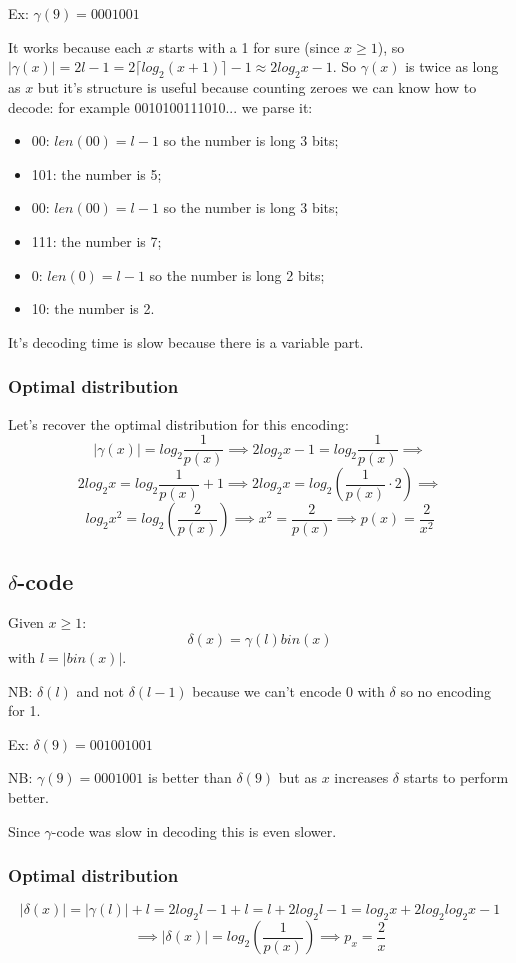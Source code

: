 Ex: $\gamma(9) = 000 1001$

It works because each $x$ starts with a 1 for sure (since $x \geq 1$), so $|\gamma(x)| = 2l-1 = 2 \lceil log_2 (x+1) \rceil - 1 \approx 2log_2 x -1$.
So $\gamma(x)$ is twice as long as $x$ but it's structure is useful because counting zeroes we can know how to decode: for example 0010100111010... we parse it:
\begin{itemize}
    \item 00: $len(00) = l-1$ so the number is long 3 bits;
    \item 101: the number is 5;
    \item 00: $len(00) = l-1$ so the number is long 3 bits;
    \item 111: the number is 7;
    \item 0: $len(0) = l-1$ so the number is long 2 bits;
    \item 10: the number is 2.
\end{itemize}

It's decoding time is slow because there is a variable part.

\subsubsection{Optimal distribution}
Let's recover the optimal distribution for this encoding:
$$
    |\gamma(x)| = log_2 \frac{1}{p(x)} \implies 2log_2 x - 1 = log_2 \frac{1}{p(x)} \implies
$$
$$
    2log_2 x = log_2 \frac{1}{p(x)} + 1 \implies 2log_2 x = log_2 \left( \frac{1}{p(x)} \cdot 2 \right) \implies
$$
$$
    log_2 x^2 = log_2 \left( \frac{2}{p(x)} \right) \implies x^2 = \frac{2}{p(x)} \implies p(x) = \frac{2}{x^2}
$$

\subsection{$\delta$-code}
Given $x \geq 1$:
$$
    \delta(x) = \gamma(l) bin(x)
$$
with $l = |bin(x)|$.

NB: $\delta(l)$ and not $\delta(l-1)$ because we can't encode 0 with $\delta$ so no encoding for 1.

Ex: $\delta(9) = 00100 1001$

NB: $\gamma(9) = 0001001$ is better than $\delta(9)$ but as $x$ increases $\delta$ starts to perform better.

Since $\gamma$-code was slow in decoding this is even slower. 

\subsubsection{Optimal distribution}
$$
    |\delta(x)| = |\gamma(l)| + l = 2log_2 l - 1 + l = l + 2log_2 l -1 = log_2 x + 2log_2 log_2 x - 1
$$
$$
    \implies |\delta(x)| = log_2 \left( \frac{1}{p(x)} \right) \implies p_x = \frac{2}{x}
$$

